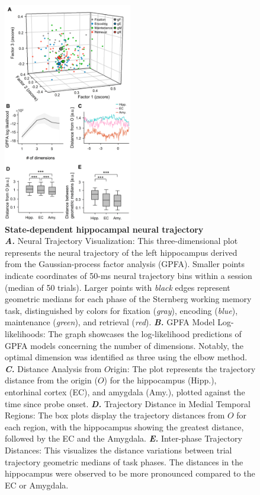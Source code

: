 \documentclass[final,3p,times,twocolumn]{elsarticle}
\begin{document}
        \clearpage
        \begin{figure}[ht]
        	\centering
            \includegraphics[width=0.5\textwidth]{./media/figures/.png/Figure_ID_02.png}
        	\caption{\textbf{
State-dependent hippocampal neural trajectory
}
\smallskip
\\
\textbf{\textit{A.}} Neural Trajectory Visualization: This three-dimensional plot represents the neural trajectory of the left hippocampus derived from the Gaussian-process factor analysis (GPFA). Smaller points indicate coordinates of 50-ms neural trajectory bins within a session (median of 50 trials). Larger points with \textit{black} edges represent geometric medians for each phase of the Sternberg working memory task, distinguished by colors for fixation (\textit{gray}), encoding (\textit{blue}), maintenance (\textit{green}), and retrieval (\textit{red}). \textbf{\textit{B.}}  GPFA Model Log-likelihoods: The graph showcases the log-likelihood predictions of GPFA models concerning the number of dimensions. Notably, the optimal dimension was identified as three using the elbow method. \textbf{\textit{C.}}  Distance Analysis from $O$rigin: The plot represents the trajectory distance from the origin ($O$) for the hippocampus (Hipp.), entorhinal cortex (EC), and amygdala (Amy.), plotted against the time since probe onset. \textbf{\textit{D.}}  Trajectory Distance in Medial Temporal Regions: The box plots display the trajectory distances from $O$ for each region, with the hippocampus showing the greatest distance, followed by the EC and the Amygdala. \textbf{\textit{E.}}  Inter-phase Trajectory Distances: This visualizes the distance variations between trial trajectory geometric medians of task phases. The distances in the hippocampus were observed to be more pronounced compared to the EC or Amygdala.
}
        	\label{fig:02}
        \end{figure}
\end{document}
